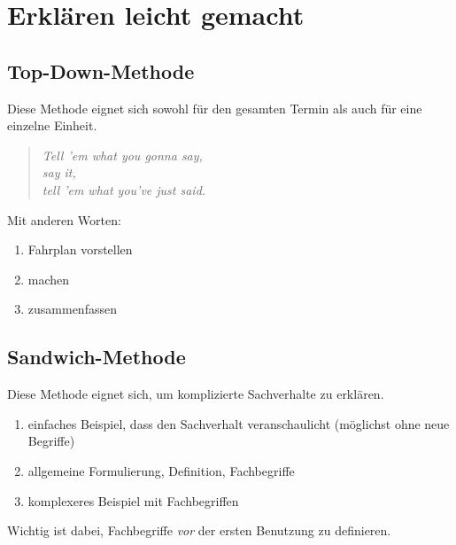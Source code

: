 \section{Erklären leicht gemacht}
\label{erklaeren}

\subsection{Top-Down-Methode}

Diese Methode eignet sich sowohl für den gesamten Termin als auch für eine einzelne Einheit.

\begin{quote}
    \emph{Tell 'em what you gonna say,\\
    say it,\\
    tell 'em what you've just said.}
\end{quote}

Mit anderen Worten:
\begin{enumerate}
    \item Fahrplan vorstellen
    \item machen
    \item zusammenfassen
\end{enumerate}

\subsection{Sandwich-Methode}

Diese Methode eignet sich, um komplizierte Sachverhalte zu erklären.

\begin{enumerate}
    \item einfaches Beispiel, dass den Sachverhalt veranschaulicht (möglichst ohne neue Begriffe)
    \item allgemeine Formulierung, Definition, Fachbegriffe
    \item komplexeres Beispiel mit Fachbegriffen
\end{enumerate}

Wichtig ist dabei, Fachbegriffe \emph{vor} der ersten Benutzung zu definieren.
